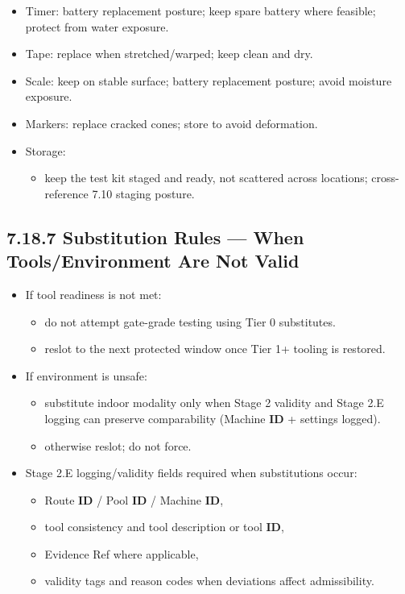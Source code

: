 \documentclass[10pt]{article}
\begin{document}
\begin{itemize}
\item Timer: battery replacement posture; keep spare battery where feasible; protect from water exposure.
\item Tape: replace when stretched/warped; keep clean and dry.
\item Scale: keep on stable surface; battery replacement posture; avoid moisture exposure.
\item Markers: replace cracked cones; store to avoid deformation.
\item Storage:
  \begin{itemize}
  \item keep the test kit staged and ready, not scattered across locations; cross-reference 7.10 staging posture.
  \end{itemize}
\end{itemize}

\subsection*{7.18.7 Substitution Rules — When Tools/Environment Are Not Valid}
{}

\begin{itemize}
\item If tool readiness is not met:
  \begin{itemize}
  \item do not attempt gate-grade testing using Tier 0 substitutes.
  \item reslot to the next protected window once Tier 1+ tooling is restored.
  \end{itemize}
\item If environment is unsafe:
  \begin{itemize}
  \item substitute indoor modality only when Stage 2 validity and Stage 2.E logging can preserve comparability (Machine \textbf{ID} + settings logged).
  \item otherwise reslot; do not force.
  \end{itemize}
\item Stage 2.E logging/validity fields required when substitutions occur:
  \begin{itemize}
  \item Route \textbf{ID} / Pool \textbf{ID} / Machine \textbf{ID},
  \item tool consistency and tool description or tool \textbf{ID},
  \item Evidence Ref where applicable,
  \item validity tags and reason codes when deviations affect admissibility.
  \end{itemize}
\end{itemize}
\end{document}
